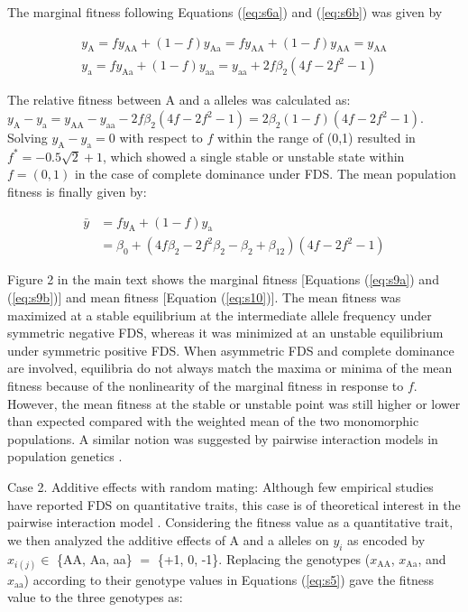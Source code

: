 \documentclass[12pt,]{article}
\begin{document}
\noindent
The marginal fitness following Equations (\ref{eq:s6a}) and (\ref{eq:s6b}) was given by 

\begin{subequations}
\begin{align}
y_\mathrm{A} = fy_\mathrm{AA} + (1-f)y_\mathrm{Aa} = fy_\mathrm{AA} + (1-f)y_\mathrm{AA} = y_\mathrm{AA} \label{eq:s9a} \\
y_\mathrm{a} = fy_\mathrm{Aa} + (1-f)y_\mathrm{aa} = y_\mathrm{aa} + 2f\beta_2(4f-2f^2-1) \label{eq:s9b}
\end{align}
\end{subequations}

\noindent
The relative fitness between A and a alleles was calculated as: $y_\mathrm{A} - y_\mathrm{a} = y_\mathrm{AA} - y_\mathrm{aa} - 2f\beta_2(4f-2f^2-1) = 2\beta_2(1-f)(4f-2f^2-1)$. Solving $y_\mathrm{A} - y_\mathrm{a} = 0$ with respect to $f$ within the range of (0,1) resulted in $f^*=-0.5\sqrt{2}+1$, which showed a single stable or unstable state within $f=(0,1)$ in the case of complete dominance under FDS. The mean population fitness is finally given by:

\begin{equation}
\begin{split}
\bar{y} &= fy_\mathrm{A} + (1-f)y_\mathrm{a} \\
&= \beta_0 + (4f\beta_2-2f^2\beta_2-\beta_2+\beta_{12})(4f-2f^2-1) \label{eq:s10}
\end{split}
\end{equation}

\noindent
Figure 2 in the main text shows the marginal fitness [Equations (\ref{eq:s9a}) and (\ref{eq:s9b})] and mean fitness [Equation (\ref{eq:s10})]. The mean fitness was maximized at a stable equilibrium at the intermediate allele frequency under symmetric negative FDS, whereas it was minimized at an unstable equilibrium under symmetric positive FDS. When asymmetric FDS and complete dominance are involved, equilibria do not always match the maxima or minima of the mean fitness because of the nonlinearity of the marginal fitness in response to $f$. However, the mean fitness at the stable or unstable point was still higher or lower than expected compared with the weighted mean of the two monomorphic populations. A similar notion was suggested by pairwise interaction models in population genetics \citep{cockerham1972frequency, schneider_maximization_2008}.

Case 2. Additive effects with random mating: Although few empirical studies have reported FDS on quantitative traits, this case is of theoretical interest in the pairwise interaction model \citep{schneider_maximization_2008}. Considering the fitness value as a quantitative trait, we then analyzed the additive effects of A and a alleles on $y_i$ as encoded by $x_{i(j)} \in $ \{AA, Aa, aa\} $=$ \{+1, 0, -1\}. Replacing the genotypes ($x_\mathrm{AA}$, $x_\mathrm{Aa}$, and $x_\mathrm{aa}$) according to their genotype values in Equations (\ref{eq:s5}) gave the fitness value to the three genotypes as:
\end{document}
